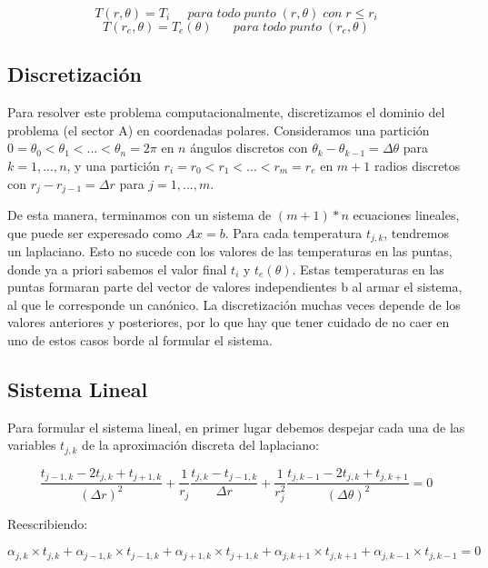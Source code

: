\begin{equation}
T(r,\theta) = T_i \;\;\;\;\;para\;todo\;punto\;(r,\theta)\;con\;r\leq r_i
\end{equation}
\begin{equation}
T(r_e,\theta) = T_e(\theta) \;\;\;\;\;\;para\;todo\;punto\;(r_e,\theta)
\end{equation}

\subsection{Discretización}

Para resolver este problema computacionalmente, discretizamos el dominio del problema (el sector A) en coordenadas polares. Consideramos una partici\'on $0 = \theta_0 < \theta_1 < ... < \theta_n = 2\pi$ en $n$ \'angulos discretos con $\theta_k-\theta_{k-1} = \Delta\theta$ para $k = 1,...,n$, y una partici\'on $r_i = r_0 < r_1 < ... < r_m = r_e$ en $m+1$ radios discretos con $r_j - r_{j-1} = \Delta r$ para $j = 1,...,m$.

De esta manera, terminamos con un sistema de $(m+1)*n$ ecuaciones lineales, que puede ser experesado como $Ax = b$. Para cada temperatura $t_{j,k}$, tendremos un laplaciano. Esto no sucede con los valores de las temperaturas en las puntas, donde ya a priori sabemos el valor final $t_i$ y $t_e(\theta)$. Estas temperaturas en las puntas formaran parte del vector de valores independientes b al armar el sistema, al que le corresponde un canónico. La discretización muchas veces depende de los valores anteriores y posteriores, por lo que hay que tener cuidado de no caer en uno de estos casos borde al formular el sistema.

\subsection{Sistema Lineal}
Para formular el sistema lineal, en primer lugar debemos despejar cada una de las variables $t_{j,k}$ de la aproximación discreta del laplaciano:

\begin{equation}\label{calor}
\frac{t_{j-1,k}-2t_{j,k}+t_{j+1,k}}{(\Delta r)^2}
+ \frac{1}{r_j}
\frac{t_{j,k}-t_{j-1,k}}{\Delta r}
+
\frac{1}{r_j^2}
\frac{t_{j,k-1}-2t_{j,k}+t_{j,k+1}}{(\Delta \theta)^2} = 0 \nonumber
\end{equation}

Reescribiendo:

\begin{equation}
\alpha_{j,k} \times t_{j,k} + \alpha_{j-1,k} \times t_{j-1,k} + \alpha_{j+1,k} \times t_{j+1,k} + \alpha_{j,k+1} \times t_{j,k+1} + \alpha_{j,k-1} \times t_{j,k-1} = 0 \nonumber
\end{equation}

